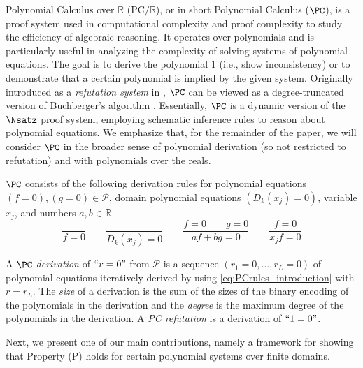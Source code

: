 \documentclass[11pt]{article}
\begin{document}
Polynomial Calculus over $\mathbb{R}$ ($\textrm{PC}\slash \mathbb{R}$), or in short Polynomial Calculus ($\PC$), is a proof system used in computational complexity and proof complexity to study the efficiency of algebraic reasoning. It operates over polynomials and is particularly useful in analyzing the complexity of solving systems of polynomial equations. The goal is to derive the polynomial \(1\) (i.e., show inconsistency) or to demonstrate that a certain polynomial is implied by the given system. 
Originally introduced as a \textit{refutation system} in \cite{CleggEI96}, $\PC$ can be viewed as a degree-truncated version of Buchberger’s algorithm \cite{JeffersonJGD13, Cox}. Essentially, $\PC$ is a dynamic version of the $\Nsatz$ proof system, employing schematic inference rules to reason about polynomial equations. We emphasize that, for the remainder of the paper, we will consider \(\PC\) in the broader sense of polynomial derivation (so not restricted to refutation) and with polynomials over the reals.

$\PC$ consists of the following derivation rules for polynomial equations $(f = 0), (g = 0) \in  \mathcal{P}$, domain polynomial equations $(D_{k}(x_j)=0)$, variable $x_j$, and numbers $a, b \in \mathbb{R}$
\begin{equation}\label{eq:PCrules_introduction}
    \frac{}{f=0} \qquad \frac{}{D_{k}(x_j)=0} \qquad \frac{f=0 \qquad g=0}{a f + b g =0} \qquad \frac{f=0}{x_jf=0} 
\end{equation}

A \emph{$\PC$ derivation} of $``r=0"$ from $\mathcal{P}$ is a sequence $(r_1=0,\ldots,r_L=0)$ of polynomial equations iteratively derived by using \eqref{eq:PCrules_introduction} with $r=r_L$. The \emph{size} of a derivation is the sum of the sizes of the binary encoding of the polynomials in the derivation and the \emph{degree} is the maximum degree of the polynomials in the derivation. A \emph{PC refutation} is a derivation of $``1=0"$.

Next, we present one of our main contributions, namely a framework for showing that Property (\textsc{P}) holds for certain polynomial systems over finite domains.
\end{document}
